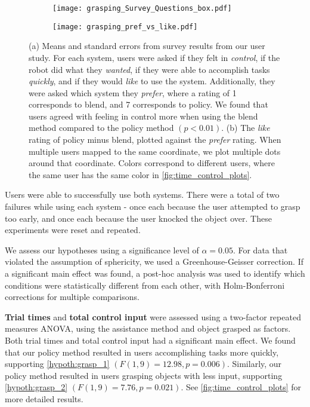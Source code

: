 \begin{figure}[t]
   \centering 
   \begin{subfigure}[b]{0.29\textwidth}
     \centering 
     \texttt{[image: grasping\_Survey\_Questions\_box.pdf]}
      \caption{ }
     \label{subfig:survey_means}
   \end{subfigure}
   \hfill
   \begin{subfigure}[b]{0.19\textwidth}
     \centering 
     \texttt{[image: grasping\_pref\_vs\_like.pdf]}
      \caption{ }
      \label{subfig:prev_vs_like}
   \end{subfigure}
   \caption{(a) Means and standard errors from survey results from our user study. For each system, users were asked if they felt in \emph{control}, if the robot did what they \emph{wanted}, if they were able to accomplish tasks \emph{quickly}, and if they would \emph{like} to use the system. Additionally, they were asked which system they \emph{prefer}, where a rating of 1 corresponds to blend, and 7 corresponds to policy. We found that users agreed with feeling in control more when using the blend method compared to the policy method $(p<0.01)$. (b) The \emph{like} rating of policy minus blend, plotted against the \emph{prefer} rating. When multiple users mapped to the same coordinate, we plot multiple dots around that coordinate. Colors correspond to different users, where the same user has the same color in \cref{fig:time_control_plots}. }
 \label{fig:survey_means}
 \end{figure}



Users were able to successfully use both systems. There were a total of two failures while using each system - once each because the user attempted to grasp too early, and once each because the user knocked the object over. These experiments were reset and repeated.

We assess our hypotheses using a significance level of $\alpha=0.05$. For data that violated the assumption of sphericity, we used a Greenhouse-Geisser correction. If a significant main effect was found, a post-hoc analysis was used to identify which conditions were statistically different from each other, with Holm-Bonferroni corrections for multiple comparisons.

\textbf{Trial times} and \textbf{total control input} were assessed using a two-factor repeated measures ANOVA, using the assistance method and object grasped as factors. Both trial times and total control input had a significant main effect. We found that our policy method resulted in users accomplishing tasks more quickly, supporting \cref{hypoth:grasp_1} $(F(1,9)=12.98, p=0.006)$. Similarly, our policy method resulted in users grasping objects with less input, supporting \cref{hypoth:grasp_2} $(F(1,9)=7.76, p = 0.021)$. See \cref{fig:time_control_plots} for more detailed results.

